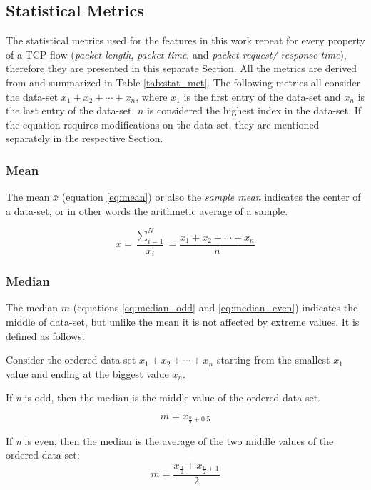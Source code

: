 \subsection{Statistical Metrics} \label{stat_met}
The statistical metrics used for the features in this work repeat for every property of a TCP-flow (\textit{packet length}, \textit{packet time}, and \textit{packet request/ response time}), therefore they are presented in this separate Section. All the metrics are derived from \cite{ross2010statistics} and summarized in Table \ref{tab:stat_met}. The following metrics all consider the data-set $x_{1}+x_{2}+\cdots+x_{n}$, where $x_{1}$ is the first entry of the data-set and $x_{n}$ is the last entry of the data-set. $n$ is considered the highest index in the data-set. If the equation requires modifications on the data-set, they are mentioned separately in the respective Section. 

\subsubsection{Mean}
The mean \cite{ross2010statistics} $\bar{x}$ (equation \ref{eq:mean}) or also the \textit{sample mean} indicates the center of a data-set, or in other words the arithmetic average of a sample. 

\begin{equation}
\bar{x} = \frac{\sum\nolimits_{i=1}^N}{x_{i}} = \frac{x_{1}+x_{2}+\cdots+x_{n}}{n}
\label{eq:mean}
\end{equation}

\subsubsection{Median}
The median \cite{ross2010statistics} $m$ (equations \ref{eq:median_odd} and \ref{eq:median_even}) indicates the middle of data-set, but unlike the mean it is not affected by extreme values. It is defined as follows:

Consider the ordered data-set $x_{1}+x_{2}+\cdots+x_{n}$ starting from the smallest $x_{1}$ value and ending at the biggest value $x_{n}$.

If \textit{n} is odd, then the median is the middle value of the ordered data-set.

\begin{equation}
m=x_{\frac{n}{2}+0.5}
\label{eq:median_odd}
\end{equation}

If \textit{n} is even, then the median is the average of the two middle values of the ordered data-set:
\begin{equation}
m=\frac{x_{\frac{n}{2}}+x_{\frac{n}{2}+1}}{2}
\label{eq:median_even}
\end{equation}

